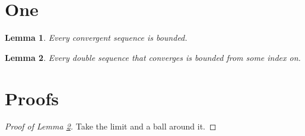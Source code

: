 \documentclass{article}
\newtheorem{lemma}{Lemma}[section]
\begin{document}
\section{One}

\begin{lemma}\label{lem b_n}
Every convergent sequence is bounded.
\end{lemma}

\begin{lemma}\label{lem b_n,m}
Every double sequence that converges is bounded from some index on.
\end{lemma}

\section{Proofs}

\begin{proof}[Proof of Lemma \ref{lem b_n,m}]
Take the limit and a ball around it.
\end{proof}
\end{document}
